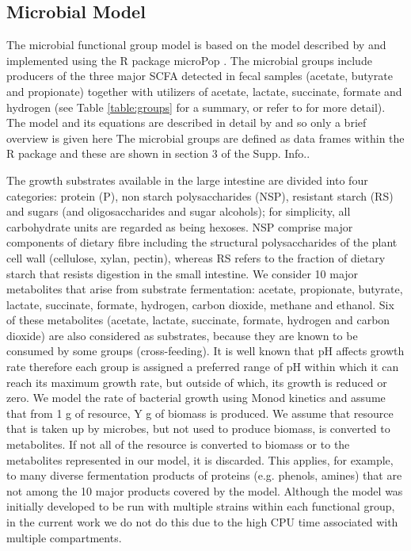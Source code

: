 \documentclass[a4paper]{article}
\begin{document}
\subsection*{Microbial Model}
The microbial functional group model is based on the model described by \cite{Kettle2015} and implemented using the R package microPop \citep{Kettle2018}.
The microbial groups include producers of the three major SCFA detected in fecal samples (acetate, butyrate and propionate) together with utilizers of acetate, lactate, succinate, formate and hydrogen (see Table \ref{table:groups} for a summary, or refer to \cite{Kettle2015} for more detail).
The model and its equations are described in detail by \cite{Kettle2015} and \cite{Kettle2018} so only a brief overview is given here
The microbial groups are defined as data frames within the R package and these are shown in section 3 of the Supp. Info..

The growth substrates available in the large intestine are divided into four categories: protein (P), non starch polysaccharides (NSP), resistant starch (RS) and sugars (and oligosaccharides and sugar alcohols); for simplicity, all carbohydrate units are regarded as being hexoses. NSP comprise major components of dietary fibre including the structural polysaccharides of the plant cell wall (cellulose, xylan, pectin), whereas RS refers to the fraction of dietary starch that resists digestion in the small intestine.
We consider 10 major metabolites that arise from substrate fermentation: acetate, propionate, butyrate, lactate, succinate, formate, hydrogen, carbon dioxide, methane and ethanol. Six of these metabolites (acetate, lactate, succinate, formate, hydrogen and carbon dioxide) are also considered as substrates, because they are known to be consumed by some groups (cross-feeding). 
It is well known that pH affects growth rate therefore each group is assigned a preferred range of pH within which it can reach its maximum growth rate, but outside of which, its growth is reduced or zero.
We model the rate of bacterial growth using Monod kinetics and assume that from 1 g of resource, Y g of biomass is produced. We assume that resource that is taken up by microbes, but not used to produce biomass, is converted to metabolites. If not all of the resource is converted to biomass or to the metabolites represented in our model, it is discarded. This applies, for example, to many diverse fermentation products of proteins (e.g. phenols, amines) that are not among the 10 major products covered by the model. 
Although the model was initially developed to be run with multiple strains within each functional group, in the current work we do not do this due to the high CPU time associated with multiple compartments.
\end{document}
